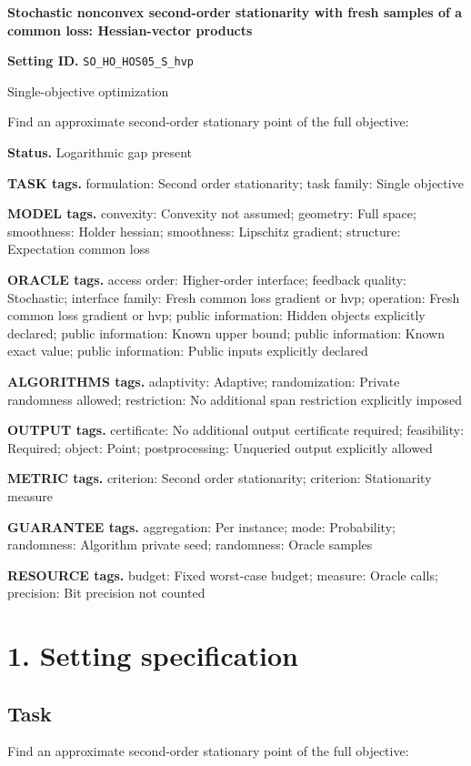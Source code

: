 \documentclass[10pt,a4paper]{article}
\begin{document}
\raggedright

{\LARGE\bfseries\sffamily\color{AtlasNavy} Stochastic nonconvex second-order stationarity with fresh samples of a common loss: Hessian-vector products\par}\vspace{5pt}
\textbf{Setting ID.} \texttt{SO\_\allowbreak{}HO\_\allowbreak{}HOS05\_\allowbreak{}S\_\allowbreak{}hvp}

Single-objective optimization

Find an approximate second-order stationary point of the full objective:

\textbf{Status.} Logarithmic gap present

\textbf{TASK tags.} formulation: Second order stationarity; task family: Single objective

\textbf{MODEL tags.} convexity: Convexity not assumed; geometry: Full space; smoothness: Holder hessian; smoothness: Lipschitz gradient; structure: Expectation common loss

\textbf{ORACLE tags.} access order: Higher-order interface; feedback quality: Stochastic; interface family: Fresh common loss gradient or hvp; operation: Fresh common loss gradient or hvp; public information: Hidden objects explicitly declared; public information: Known upper bound; public information: Known exact value; public information: Public inputs explicitly declared

\textbf{ALGORITHMS tags.} adaptivity: Adaptive; randomization: Private randomness allowed; restriction: No additional span restriction explicitly imposed

\textbf{OUTPUT tags.} certificate: No additional output certificate required; feasibility: Required; object: Point; postprocessing: Unqueried output explicitly allowed

\textbf{METRIC tags.} criterion: Second order stationarity; criterion: Stationarity measure

\textbf{GUARANTEE tags.} aggregation: Per instance; mode: Probability; randomness: Algorithm private seed; randomness: Oracle samples

\textbf{RESOURCE tags.} budget: Fixed worst-case budget; measure: Oracle calls; precision: Bit precision not counted

\section{1. Setting specification}
\subsection{Task}
Find an approximate second-order stationary point of the full objective:
\end{document}
